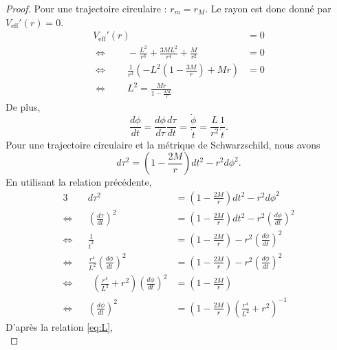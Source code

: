 \documentclass[a4paper,11pt]{report}
\theoremstyle{definition}
\theoremstyle{plain}
\theoremstyle{definition}
\theoremstyle{remark}
\begin{document}
        \begin{proof}
            Pour une trajectoire circulaire : $r_m=r_M$. Le rayon est donc donné par $V_{\text{eff}}'(r) = 0$.
            \begin{align}
                V_{\text{eff}}'(r) &= 0\\
                \Leftrightarrow\qquad -\frac{L^2}{r^3}+\frac{3ML^2}{r^4}+\frac{M}{r^2} &= 0\\
                \Leftrightarrow\qquad \frac{1}{r^3}\left( -L^2\left( 1-\frac{3M}{r}\right)+Mr \right) &= 0 \\
                \Leftrightarrow\qquad L^2 = \frac{Mr}{1-\frac{3M}{r}}\label{eq:L}
            \end{align}
            De plus, 
            \begin{equation}
                \frac{d\phi}{dt} = \frac{d\phi}{d\tau}\frac{d\tau}{dt} = \frac{\dot{\phi}}{\dot{t}} = \frac{L}{r^2}\frac{1}{\dot{t}}.
            \end{equation}
            Pour une trajectoire circulaire et la métrique de Schwarzschild, nous avons
            \begin{equation}
                d\tau^2 = \left( 1-\frac{2M}{r} \right)dt^2-r^2 d\phi^2.
            \end{equation}
            En utilisant la relation précédente, 
            \begin{alignat}{3}
                && d\tau^2 &= \left( 1-\frac{2M}{r} \right)dt^2-r^2 d\phi^2\\
                \Leftrightarrow&& \left(\frac{d\tau}{dt}\right)^2 &= \left( 1-\frac{2M}{r} \right)dt^2-r^2 \left(\frac{d\phi}{dt}\right)^2 \\
                \Leftrightarrow&& \frac{1}{\dot{t}^2} &= \left( 1-\frac{2M}{r} \right)-r^2\left(\frac{d\phi}{dt}\right)^2\\
                \Leftrightarrow&& \frac{r^4}{L^2}\left(\frac{d\phi}{dt}\right)^2 &= \left( 1-\frac{2M}{r} \right)-r^2\left(\frac{d\phi}{dt}\right)^2\\
                \Leftrightarrow&&~~ \left( \frac{r^4}{L^2} + r^2 \right)\left(\frac{d\phi}{dt}\right)^2 &= \left( 1-\frac{2M}{r} \right)\\
                \Leftrightarrow&& \left(\frac{d\phi}{dt}\right)^2 &= \left( 1-\frac{2M}{r} \right) \left( \frac{r^4}{L^2} + r^2 \right)^{-1}\label{eq:findevphit}
            \end{alignat}
            D'après la relation \ref{eq:L}, 
            \begin{equation}

\end{equation}
\end{proof}
\end{document}
